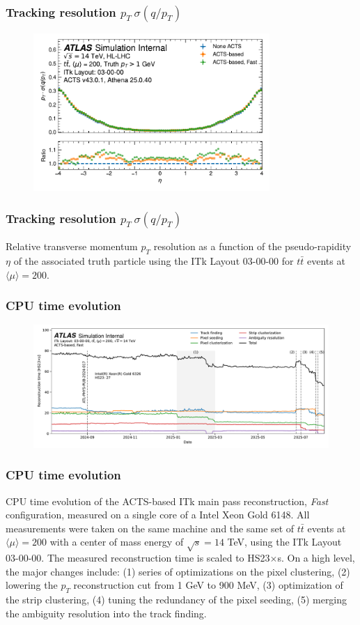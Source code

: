 \documentclass[aspectratio=169]{beamer}
\begin{document}
\begin{frame}
\frametitle{Tracking resolution $p_T \ \sigma(q/p_T)$}
\begin{figure}[h]
    \centering
    \includegraphics[width=0.8\textwidth]{plots/tracking_resolution_ptqopt.pdf}
\end{figure}
\end{frame}

\begin{frame}
\frametitle{Tracking resolution $p_T \ \sigma(q/p_T)$}
Relative transverse momentum $p_T$ resolution as a function of the pseudo-rapidity $\eta$ of the associated truth particle using the ITk Layout 03-00-00 for $t\bar{t}$ events at $\langle \mu \rangle = 200$.
\end{frame}

\begin{frame}
\frametitle{CPU time evolution}
\begin{figure}[h]
    \centering
    \includegraphics[width=1.0\textwidth]{plots/spot.pdf}
\end{figure}
\end{frame}

\begin{frame}
\frametitle{CPU time evolution}
CPU time evolution of the ACTS-based ITk main pass reconstruction, \textit{Fast} configuration, measured on a single core of a Intel Xeon Gold 6148. All measurements were taken on the same machine and the same set of $t\bar{t}$ events at $\langle \mu \rangle = 200$ with a center of mass energy of $\sqrt{s}=14$ TeV, using the ITk Layout 03-00-00. The measured reconstruction time is scaled to HS23$\times$s. On a high level, the major changes include: (1) series of optimizations on the pixel clustering, (2) lowering the $p_T$ reconstruction cut from 1 GeV to 900 MeV, (3) optimization of the strip clustering, (4) tuning the redundancy of the pixel seeding, (5) merging the ambiguity resolution into the track finding.
\end{frame}
\end{document}
